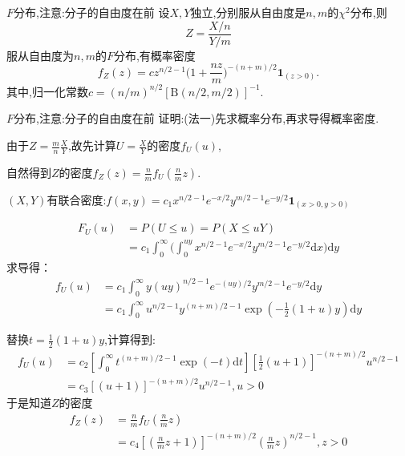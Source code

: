 	\begin{frame}{$F$分布,注意:分子的自由度在前}
		设$X,Y$独立,分别服从自由度是$n,m$的$\chi^2$分布,则
		\alert{
		\begin{equation}
			Z = \frac{X/n}{Y/m}
		\end{equation}
		服从自由度为$n,m$的$F$分布},有概率密度
		\begin{equation}
			f_Z(z) = cz^{n/2-1}\bigg(1+\frac{nz}{m}\bigg)^{-(n+m)/2}\bm{1}_{(z>0)}.
		\end{equation}
		其中,归一化常数$c = (n/m)^{n/2}[\mathrm{B}(n/2,m/2)]^{-1}$.
	\end{frame}

	\begin{frame}{$F$分布,注意:分子的自由度在前}
		证明:(法一)先求概率分布,再求导得概率密度.
		
		由于$Z = \frac{m}{n}\frac{X}{Y}$,故先计算$U =\frac{X}{Y}$的密度$f_U(u)$,
		
		自然得到$Z$的密度$f_Z(z) = \frac{n}{m}f_U(\frac{n}{m}z)$.
		
		$(X,Y)$有联合密度:$f(x,y) = c_1x^{n/2-1}e^{-x/2}y^{m/2-1}e^{-y/2}\bm{1}_{(x>0,y>0)}$
		
		\begin{equation}
			\begin{split}
				F_U(u) &= P(U\leqslant u) = P(X\leqslant uY) \\
				&= c_1\int_{0}^{\infty} \bigg(\int_{0}^{uy}x^{n/2-1}e^{-x/2}y^{m/2-1}e^{-y/2} \mathrm{d}x\bigg)\mathrm{d}y
			\end{split}
		\end{equation}
		求导得：
		\begin{equation}
		\begin{split}
			f_U(u) &=  c_1\int_{0}^{\infty} y(uy)^{n/2-1}e^{-(uy)/2}y^{m/2-1}e^{-y/2} \mathrm{d}y \\
			&= c_1 \int_{0}^{\infty}u^{n/2-1}y^{(n+m)/2-1}\exp (-\frac{1}{2}(1+u)y) \mathrm{d}y
		\end{split}
		\end{equation} 
	
	\end{frame}


	\begin{frame}
		替换$t = \frac{1}{2}(1+u)y$,计算得到:
		\begin{equation}
			\begin{split}
				f_U(u) &= c_2 [\int_{0}^{\infty} t^{(n+m)/2-1}\exp (-t) \mathrm{d}t][\frac{1}{2}(u+1)]^{-(n+m)/2} u^{n/2-1} \\
				&= c_3 [(u+1)]^{-(n+m)/2} u^{n/2-1}, u>0
			\end{split}
		\end{equation}
		于是知道$Z$的密度
		\begin{equation}
			\begin{split}
				f_Z(z) &= \frac{n}{m}f_U(\frac{n}{m}z) \\
				&= c_4 [(\frac{n}{m}z+1)]^{-(n+m)/2} (\frac{n}{m}z)^{n/2-1}, z>0
			\end{split}
		\end{equation}
	\end{frame}

